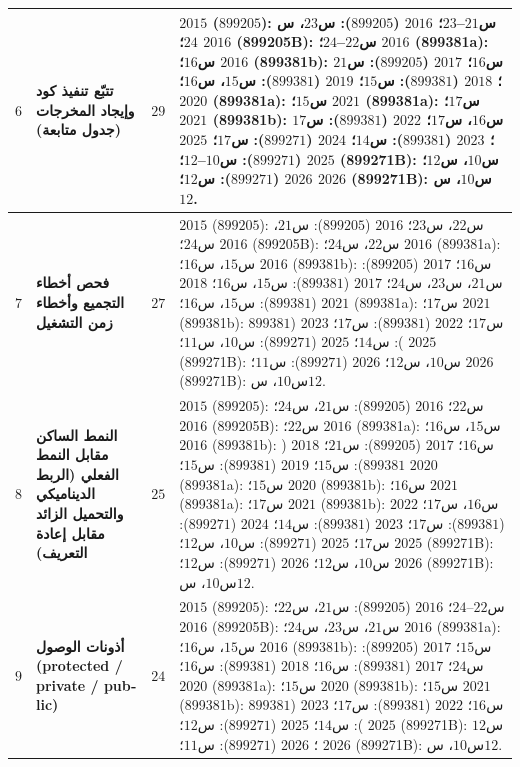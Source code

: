 \documentclass[14pt]{extarticle}
\begin{document}
{\begin{longtable}{|C{0.05\textwidth}|>{\raggedleft\arraybackslash}p{0.27\textwidth}|C{0.09\textwidth}|>{\raggedleft\arraybackslash}p{0.47\textwidth}|}
$6$ &
\textbf{تتبّع تنفيذ كود وإيجاد المخرجات (جدول متابعة)} &
\textbf{$29$} &
$2015$ ($899205$): س$21$--$23$؛
$2016$ ($899205$): س$23$، س$24$؛
$2016$ (\textenglish{899205B}): س$22$--$24$؛
$2016$ (\textenglish{899381a}): س$16$؛
$2016$ (\textenglish{899381b}): س$16$؛
$2017$ ($899205$): س$21$؛
$2018$ ($899381$): س$15$؛
$2019$ ($899381$): س$15$، س$16$؛
$2020$ (\textenglish{899381a}): س$15$؛
$2021$ (\textenglish{899381a}): س$17$؛
$2021$ (\textenglish{899381b}): س$16$، س$17$؛
$2022$ ($899381$): س$17$؛
$2023$ ($899381$): س$14$؛
$2024$ ($899271$): س$17$؛
$2025$ ($899271$): س$10$--$12$؛
$2025$ (\textenglish{899271B}): س$10$، س$12$؛
$2026$ ($899271$): س$12$؛
$2026$ (\textenglish{899271B}): س$10$، س$12$. \\
\hline

$7$ &
\textbf{فحص أخطاء التجميع وأخطاء زمن التشغيل} &
\textbf{$27$} &
$2015$ ($899205$): س$22$، س$23$؛
$2016$ ($899205$): س$21$، س$24$؛
$2016$ (\textenglish{899205B}): س$22$، س$24$؛
$2016$ (\textenglish{899381a}): س$15$، س$16$؛
$2016$ (\textenglish{899381b}): س$16$؛
$2017$ ($899205$): س$21$، س$23$، س$24$؛
$2017$ ($899381$): س$15$، س$16$؛
$2018$ ($899381$): س$15$، س$16$؛
$2021$ (\textenglish{899381a}): س$17$؛
$2021$ (\textenglish{899381b}): س$17$؛
$2022$ ($899381$): س$17$؛
$2023$ ($899381$): س$14$؛
$2025$ ($899271$): س$10$، س$11$؛
$2025$ (\textenglish{899271B}): س$10$، س$12$؛
$2026$ ($899271$): س$11$؛
$2026$ (\textenglish{899271B}): س$10$، س$12$. \\
\hline

$8$ &
\textbf{النمط الساكن مقابل النمط الفعلي (الربط الديناميكي والتحميل الزائد مقابل إعادة التعريف)} &
\textbf{$25$} &
$2015$ ($899205$): س$22$؛
$2016$ ($899205$): س$21$، س$24$؛
$2016$ (\textenglish{899205B}): س$22$؛
$2016$ (\textenglish{899381a}): س$15$، س$16$؛
$2016$ (\textenglish{899381b}): س$16$؛
$2017$ ($899205$): س$21$؛
$2018$ ($899381$): س$15$؛
$2019$ ($899381$): س$15$؛
$2020$ (\textenglish{899381a}): س$15$؛
$2020$ (\textenglish{899381b}): س$16$؛
$2021$ (\textenglish{899381a}): س$17$؛
$2021$ (\textenglish{899381b}): س$16$، س$17$؛
$2022$ ($899381$): س$17$؛
$2023$ ($899381$): س$14$؛
$2024$ ($899271$): س$17$؛
$2025$ ($899271$): س$10$، س$12$؛
$2025$ (\textenglish{899271B}): س$10$، س$12$؛
$2026$ ($899271$): س$12$؛
$2026$ (\textenglish{899271B}): س$10$، س$12$. \\
\hline

$9$ &
\textbf{أذونات الوصول (\textenglish{protected} / \textenglish{private} / \textenglish{public})} &
\textbf{$24$} &
$2015$ ($899205$): س$22$--$24$؛
$2016$ ($899205$): س$21$، س$22$؛
$2016$ (\textenglish{899205B}): س$21$، س$23$، س$24$؛
$2016$ (\textenglish{899381a}): س$15$، س$16$؛
$2016$ (\textenglish{899381b}): س$15$؛
$2017$ ($899205$): س$24$؛
$2017$ ($899381$): س$16$؛
$2018$ ($899381$): س$16$؛
$2020$ (\textenglish{899381a}): س$15$؛
$2020$ (\textenglish{899381b}): س$15$؛
$2021$ (\textenglish{899381b}): س$16$؛
$2022$ ($899381$): س$17$؛
$2023$ ($899381$): س$14$؛
$2025$ ($899271$): س$12$؛
$2025$ (\textenglish{899271B}): س$12$؛
$2026$ ($899271$): س$11$؛
$2026$ (\textenglish{899271B}): س$10$، س$12$. \\
\hline


\end{longtable}}
\end{document}
